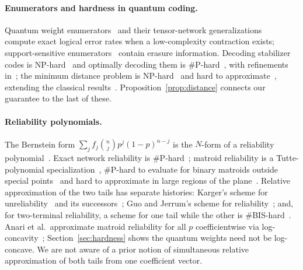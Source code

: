 \documentclass[11pt]{article}
\theoremstyle{remark}
\begin{document}
\paragraph{Enumerators and hardness in quantum coding.}
Quantum weight enumerators~\cite{shorlaflamme1997,rains1998} and their
tensor-network generalizations~\cite{caolackey2022,cao2024expansion}
compute exact logical error rates when a low-complexity contraction
exists; support-sensitive enumerators~\cite{scott2005} contain erasure
information. Decoding stabilizer codes is NP-hard~\cite{hsiehlegall2011}
and optimally decoding them is \#P-hard~\cite{iyerpoulin2015}, with
refinements in~\cite{kuolu2020,fischermiyake2024}; the minimum distance
problem is NP-hard~\cite{kapshikarkundu2023} and hard to
approximate~\cite{gjs2025,kapshikar2026}, extending the classical
results~\cite{bmvt1978,vardy1997}. Proposition~\ref{prop:distance}
connects our guarantee to the last of these.

\paragraph{Reliability polynomials.}
The Bernstein form \(\sum_jf_j\binom njp^j(1-p)^{n-j}\) is the
\(N\)-form of a reliability polynomial~\cite{mooreshannon1956,colbourn1987}.
Exact network reliability is \#P-hard~\cite{valiant1979reliability,provanball1983};
matroid reliability is a Tutte-polynomial
specialization~\cite{britz2002}, \#P-hard to evaluate for binary matroids
outside special points~\cite{jvw1990} and hard to approximate in large
regions of the plane~\cite{goldbergjerrum2013binary}. Relative
approximation of the two tails has separate histories: Karger's scheme
for unreliability~\cite{karger1999} and its
successors~\cite{harrissrinivasan2018,karger2020,cen2024,cen2025}; Guo and
Jerrum's scheme for reliability~\cite{guojerrum2019}; and, for
two-terminal reliability, a scheme for one tail while the other is
\#BIS-hard~\cite{fengguo2023,fengfuguo2026}. Anari et al.\ approximate
matroid reliability for all \(p\) coefficientwise via
log-concavity~\cite{alov2024}; Section~\ref{sec:hardness} shows the
quantum weights need not be log-concave. We are not aware of a prior
notion of simultaneous relative approximation of both tails from one
coefficient vector.
\end{document}
